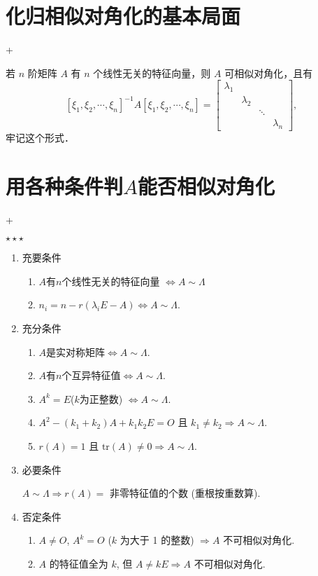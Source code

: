 \section{化归相似对角化的基本局面}
\DOne+\DTwoThree

若 $n$ 阶矩阵 $A$ 有 $n$ 个线性无关的特征向量，则 $A$ 可相似对角化，且有
$$[\xi_1, \xi_2, \cdots, \xi_n]^{-1} A [\xi_1, \xi_2, \cdots, \xi_n] = \begin{bmatrix} \lambda_1 & & \\ & \lambda_2 & \\ & & \ddots \\ & & & \lambda_n \end{bmatrix},$$
牢记这个形式．

\section{用各种条件判$A$能否相似对角化}
\DOne+\DTwoTwo

$\star \star \star$

\begin{enumerate}
    \item 充要条件
          \begin{enumerate}
              \item $A$有$n$个线性无关的特征向量 $\Leftrightarrow A \sim\Lambda$
              \item $n_i = n - r(\lambda_i E - A) \Leftrightarrow A \sim \Lambda$.
          \end{enumerate}
    \item 充分条件
          \begin{enumerate}
              \item $A$是实对称矩阵$\Leftrightarrow A \sim \Lambda$.
              \item $A$有$n$个互异特征值$\Leftrightarrow A \sim \Lambda$.
              \item $A^k=E$($k$为正整数) $\Leftrightarrow A \sim \Lambda$.
              \item $A^2 - (k_1 + k_2)A + k_1 k_2 E = O$ 且 $k_1 \neq k_2 \Rightarrow A \sim \Lambda$.
              \item $r(A) = 1$ 且 $\text{tr}(A) \neq 0 \Rightarrow A \sim \Lambda$.
          \end{enumerate}
    \item 必要条件

          $A \sim \Lambda \Rightarrow r(A) =$ 非零特征值的个数 (重根按重数算).
    \item 否定条件
          \begin{enumerate}
              \item $A \neq O$, $A^k = O$ ($k$ 为大于 1 的整数) $\Rightarrow A$ 不可相似对角化.
              \item $A$ 的特征值全为 $k$, 但 $A \neq kE \Rightarrow A$ 不可相似对角化.
          \end{enumerate}
\end{enumerate}

